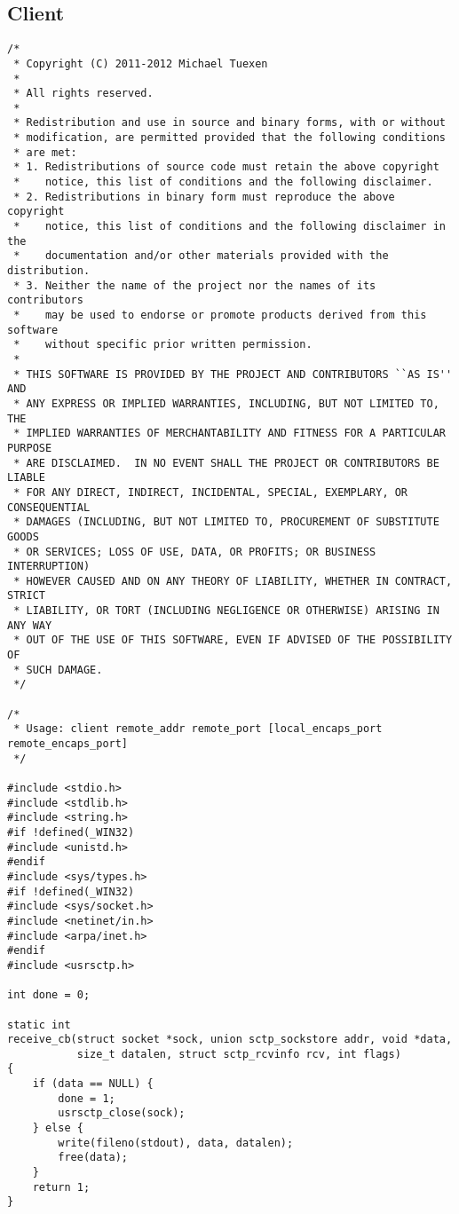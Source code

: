 \documentclass[a4paper]{article}
\begin{document}
\subsection{Client}\label{client}
\begin{verbatim}
/*
 * Copyright (C) 2011-2012 Michael Tuexen
 *
 * All rights reserved.
 *
 * Redistribution and use in source and binary forms, with or without
 * modification, are permitted provided that the following conditions
 * are met:
 * 1. Redistributions of source code must retain the above copyright
 *    notice, this list of conditions and the following disclaimer.
 * 2. Redistributions in binary form must reproduce the above copyright
 *    notice, this list of conditions and the following disclaimer in the
 *    documentation and/or other materials provided with the distribution.
 * 3. Neither the name of the project nor the names of its contributors
 *    may be used to endorse or promote products derived from this software
 *    without specific prior written permission.
 *
 * THIS SOFTWARE IS PROVIDED BY THE PROJECT AND CONTRIBUTORS ``AS IS'' AND
 * ANY EXPRESS OR IMPLIED WARRANTIES, INCLUDING, BUT NOT LIMITED TO, THE
 * IMPLIED WARRANTIES OF MERCHANTABILITY AND FITNESS FOR A PARTICULAR PURPOSE
 * ARE DISCLAIMED.	IN NO EVENT SHALL THE PROJECT OR CONTRIBUTORS BE LIABLE
 * FOR ANY DIRECT, INDIRECT, INCIDENTAL, SPECIAL, EXEMPLARY, OR CONSEQUENTIAL
 * DAMAGES (INCLUDING, BUT NOT LIMITED TO, PROCUREMENT OF SUBSTITUTE GOODS
 * OR SERVICES; LOSS OF USE, DATA, OR PROFITS; OR BUSINESS INTERRUPTION)
 * HOWEVER CAUSED AND ON ANY THEORY OF LIABILITY, WHETHER IN CONTRACT, STRICT
 * LIABILITY, OR TORT (INCLUDING NEGLIGENCE OR OTHERWISE) ARISING IN ANY WAY
 * OUT OF THE USE OF THIS SOFTWARE, EVEN IF ADVISED OF THE POSSIBILITY OF
 * SUCH DAMAGE.
 */

/*
 * Usage: client remote_addr remote_port [local_encaps_port remote_encaps_port]
 */

#include <stdio.h>
#include <stdlib.h>
#include <string.h>
#if !defined(_WIN32)
#include <unistd.h>
#endif
#include <sys/types.h>
#if !defined(_WIN32)
#include <sys/socket.h>
#include <netinet/in.h>
#include <arpa/inet.h>
#endif
#include <usrsctp.h>

int done = 0;

static int
receive_cb(struct socket *sock, union sctp_sockstore addr, void *data,
           size_t datalen, struct sctp_rcvinfo rcv, int flags)
{
    if (data == NULL) {
        done = 1;
        usrsctp_close(sock);
    } else {
        write(fileno(stdout), data, datalen);
        free(data);
    }
    return 1;
}


\end{verbatim}
\end{document}
